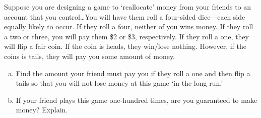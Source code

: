 \documentclass[11pt,letterpaper]{article}
\begin{document}
\newpage



 Suppose you are designing a game to `reallocate' money from your friends to an account that you control\dots You will have them roll a four-sided dice---each side equally likely to occur. If they roll a four, neither of you wins money. If they roll a two or three, you will pay them \$2 or \$3, respectively. If they roll a one, they will flip a fair coin. If the coin is heads, they win/lose nothing. However, if the coins is tails, they will pay you some amount of money. 
	\begin{enumerate}[(a)]
	\item Find the amount your friend must pay you if they roll a one and then flip a tails so that you will not lose money at this game `in the long run.' 
	\item If your friend plays this game one-hundred times, are you guaranteed to make money? Explain. 
	\end{enumerate} \pspace
\end{document}
